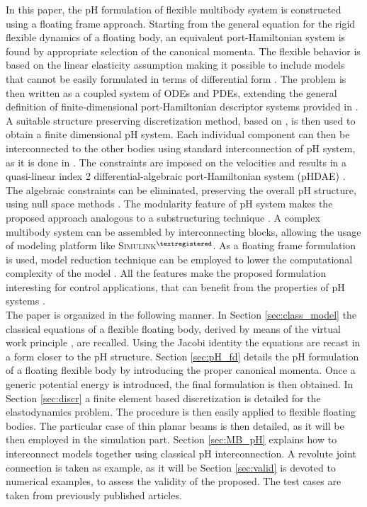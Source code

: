 \documentclass{svjour3}                     %
\begin{document}
\indent In this paper, the pH formulation of flexible multibody system is constructed using a floating frame approach. Starting from the general equation for the rigid flexible dynamics of a floating body, an equivalent port-Hamiltonian system is found by appropriate selection of the canonical momenta. The flexible behavior is based on the linear elasticity assumption making it possible to include models that cannot be easily formulated in terms of differential form  \cite{BRUGNOLI2019940,BRUGNOLI2019961}. The problem is then written as a coupled system of ODEs and PDEs, extending the general definition of finite-dimensional port-Hamiltonian descriptor systems provided in \cite{mehrmann2019structurepreserving}. A suitable structure preserving discretization method, based on \cite{cardoso2019partitioned}, is then used to obtain a finite dimensional pH system. Each individual component can then be interconnected to the other bodies using standard interconnection of pH system, as it is done in \cite{macchelli_flrig}. The constraints are imposed on the velocities and results in a quasi-linear index 2 differential-algebraic port-Hamiltonian system (pHDAE) \cite{phd_steinbrecher}. The algebraic constraints can be eliminated, preserving the overall pH structure, using null space methods \cite{nullspaceFlMult}. The modularity feature of pH system makes the proposed approach analogous to a substructuring technique \cite{substructuring}. A complex multibody system can be assembled by interconnecting blocks, allowing the usage of modeling platform like \textsc{Simulink}$^{\tiny{\textregistered}}$. As a floating frame formulation is used, model reduction technique can be employed to lower the computational complexity of the model \cite{phode_red,phdae_red}. All the features make the proposed formulation interesting for control applications, that can benefit from the properties of pH systems \cite{ORTEGAsurvey,PHadaptive}. \\
\indent The paper is organized in the following manner. In Section \ref{sec:class_model} the classical equations of a flexible floating body, derived by means of the virtual work principle \cite{MB_Daepde,simeon2013computational}, are recalled. Using the Jacobi identity the equations are recast in a form closer to the pH structure. Section \ref{sec:pH_fd} details the pH formulation of a floating flexible body by introducing the proper canonical momenta. Once a generic potential energy is introduced, the final formulation is then obtained. In Section \ref{sec:discr} a finite element based discretization is detailed for the elastodynamics problem. The procedure is then easily applied to flexible floating bodies. The particular case of thin planar beams is then detailed, as it will be then employed in the simulation part. Section \ref{sec:MB_pH} explains how to interconnect models together using classical pH interconnection. A revolute joint connection is taken as example, as it will be  Section \ref{sec:valid} is devoted to numerical examples, to assess the validity of the proposed. The test cases are taken from previously published articles.
\end{document}
